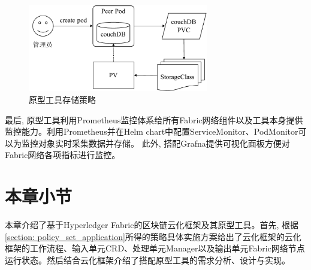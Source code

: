 \begin{figure}[h] %
    \centering %
    \includegraphics[width=0.7\textwidth]{FIGs/chapter4/pvc_sc.pdf} %
    \caption{原型工具存储策略} %
    \label{pvc_sc} %
\end{figure}%

最后, 原型工具利用Prometheus监控体系给所有Fabric网络组件以及工具本身提供监控能力。利用Prometheus并在Helm chart中配置ServiceMonitor、PodMonitor可以为监控对象实时采集数据并存储。 此外, 搭配Grafna提供可视化面板方便对Fabric网络各项指标进行监控。

\section{本章小节}

本章介绍了基于Hyperledger Fabric的区块链云化框架及其原型工具。首先, 根据\ref{section: policy_set_application}所得的策略具体实施方案给出了云化框架的云化框架的工作流程、输入单元CRD、处理单元Manager以及输出单元Fabric网络节点运行状态。然后结合云化框架介绍了搭配原型工具的需求分析、设计与实现。






